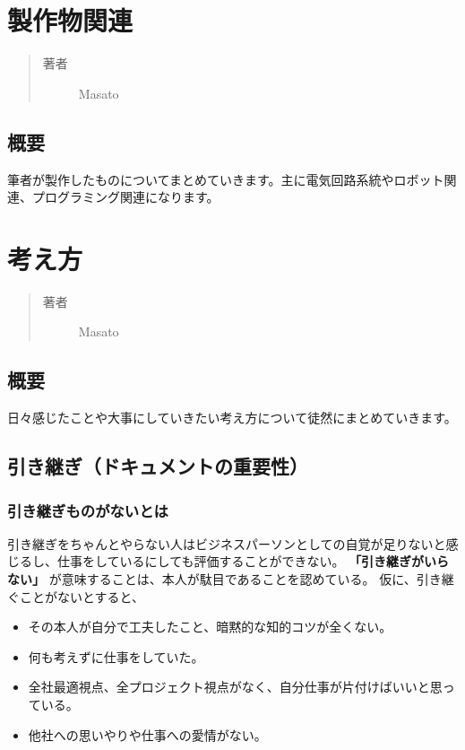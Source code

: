 \documentclass[letterpaper,10pt,dvipdfmx]{sphinxmanual}
\begin{document}
\chapter{製作物関連}
\label{works:id1}\label{works::doc}\begin{quote}\begin{description}
\item[{著者}] \leavevmode
Masato

\end{description}\end{quote}


\section{概要}
\label{works:id2}
筆者が製作したものについてまとめていきます。主に電気回路系統やロボット関連、プログラミング関連になります。


\chapter{考え方}
\label{tips:id1}\label{tips::doc}\begin{quote}\begin{description}
\item[{著者}] \leavevmode
Masato

\end{description}\end{quote}


\section{概要}
\label{tips:id2}
日々感じたことや大事にしていきたい考え方について徒然にまとめていきます。


\section{引き継ぎ（ドキュメントの重要性）}
\label{tips:id3}

\subsection{引き継ぎものがないとは}
\label{tips:id4}
引き継ぎをちゃんとやらない人はビジネスパーソンとしての自覚が足りないと感じるし、仕事をしているにしても評価することができない。 \textbf{「引き継ぎがいらない」} が意味することは、本人が駄目であることを認めている。
仮に、引き継ぐことがないとすると、
\begin{itemize}
\item {} 
その本人が自分で工夫したこと、暗黙的な知的コツが全くない。

\item {} 
何も考えずに仕事をしていた。

\item {} 
全社最適視点、全プロジェクト視点がなく、自分仕事が片付けばいいと思っている。

\item {} 
他社への思いやりや仕事への愛情がない。

\end{itemize}
\end{document}

